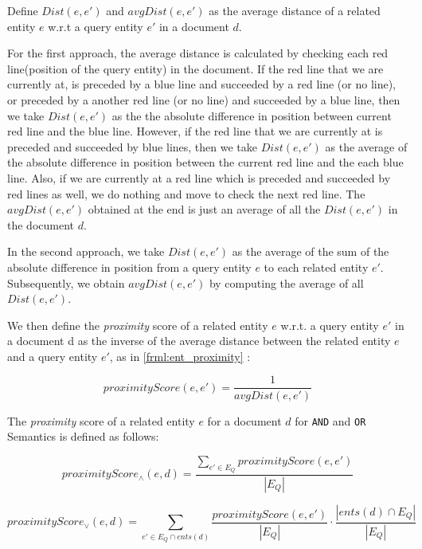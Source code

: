 \documentclass[10pt,a4paper]{article} %
\begin{document}
    \noindent Define $Dist(e,e')$ and $avgDist(e,e')$ as the average distance of a related entity $e$ w.r.t a query entity $e'$ in a document $d$. 
    
    \noindent For the first approach, the average distance is calculated by checking each red line(position of the query entity) 
    in the document. If the red line that we are currently at, is preceded by a blue line and succeeded by a red line (or no line), or preceded by a another red line (or no line) and succeeded by a blue line, then we take $Dist(e,e')$ as the the absolute difference in position between current red line and the blue line. 
    However, if the red line that we are currently at is preceded and succeeded by blue lines, then we take $Dist(e,e')$ as the average of the absolute difference in position between the current red line and the each blue line.
    Also, if we are currently at a red line which is preceded and succeeded by red lines as well, we do nothing and 
    move to check the next red line.
    The $avgDist(e,e')$ obtained at the end is just an average of all the $Dist(e,e')$ in the document $d$. 
    
    \noindent In the second approach, we take $Dist(e, e')$ as the average of the sum of 
    the absolute difference in position from a query entity $e$ to each related entity 
    $e'$. 
    Subsequently, we obtain $avgDist(e,e')$ by computing the average of all $Dist(e, e')$.   
    
    
    \noindent We then define the {\em proximity} score of a related entity $e$ w.r.t. a query entity $e'$ in a document d as the inverse of the average distance between the related entity $e$ and a query entity $e'$, as in \ref{frml:ent_proximity} :
    
    \begin{equation}
    \label{frml:ent_proximity}
    proximityScore(e, e') = \frac{1}{avgDist(e,e')}
    \end{equation}

    \noindent The {\em proximity} score of a related entity $e$ for a document $d$ for {\tt AND} and {\tt OR} Semantics is defined as follows:
    
    \begin{equation}
    \label{frml:doc_proximity_and}
    proximityScore_{\wedge}(e,d) = \frac{\sum_{e' \in E_Q}{proximityScore(e,e')}}{|E_Q|}
    \end{equation}

    \begin{equation}
    \label{frml:doc_proximity_or}
    proximityScore_{\vee}(e,d) = {\sum_{e' \in E_Q \cap ents(d)}{\frac{proximityScore(e,e')}{|E_Q|}}} \cdot \frac{|ents(d) \cap E_Q|}{|E_Q|}
    \end{equation}
\end{document}
